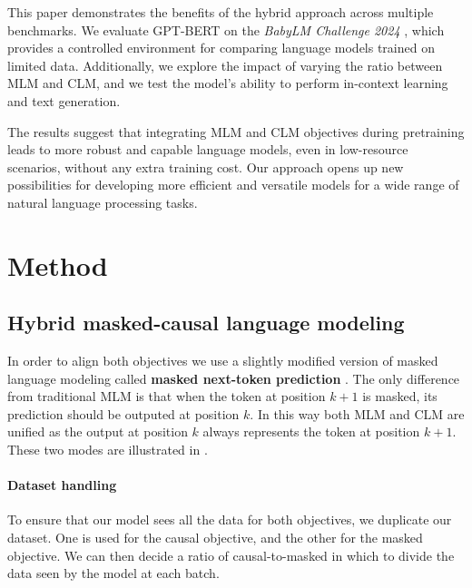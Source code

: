 This paper demonstrates the benefits of the hybrid approach across multiple benchmarks. We evaluate \textsc{GPT-BERT} on the \textit{BabyLM Challenge 2024} \citep{babylm-2024}, which provides a controlled environment for comparing language models trained on limited data. Additionally, we explore the impact of varying the ratio between MLM and CLM, and we test the model's ability to perform in-context learning and text generation.

The results suggest that integrating MLM and CLM objectives during pretraining leads to more robust and capable language models, even in low-resource scenarios, without any extra training cost. Our approach opens up new possibilities for developing more efficient and versatile models for a wide range of natural language processing tasks.

\section{Method}

\subsection{Hybrid masked-causal language modeling}
\label{sec:hybrid}

    
    
    
    In order to align both objectives we use a slightly modified version of masked language modeling called \textbf{masked next-token prediction} \citep[MNTP;][]{behnamghader2024llmvec}. The only difference from traditional MLM is that when the token at position $k+1$ is masked, its prediction should be outputed at position $k$. In this way both MLM and CLM are unified as the output at position $k$ always represents the token at position $k+1$. These two modes are illustrated in .
    
    \paragraph{Dataset handling} To ensure that our model sees all the data for both objectives, we duplicate our dataset. One is used for the causal objective, and the other for the masked objective. We can then decide a ratio of causal-to-masked in which to divide the data seen by the model at each batch.%
    
